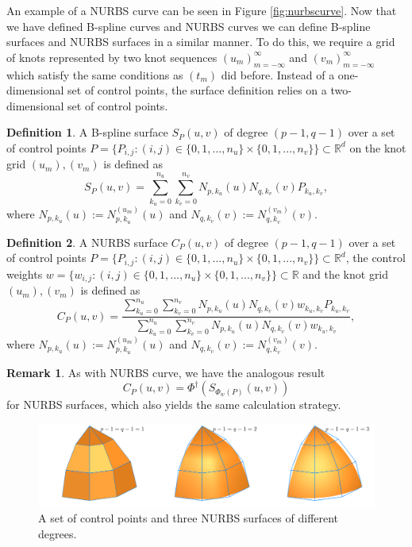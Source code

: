 \documentclass[a4paper, 11pt]{report}
\theoremstyle{definition}
\newtheorem{definition}{Definition}[section]
\newtheorem*{remark}{Remark}
\begin{document}
	An example of a NURBS curve can be seen in Figure \ref{fig:nurbscurve}. Now that we have defined B-spline curves and NURBS curves we can define B-spline surfaces and NURBS surfaces in a similar manner. To do this, we require a grid of knots represented by two knot sequences $(u_m)_{m=-\infty}^{\infty}$ and $(v_m)_{m=-\infty}^{\infty}$ which satisfy the same conditions as $(t_m)$ did before. Instead of a one-dimensional set of control points, the surface definition relies on a two-dimensional set of control points.

	\begin{definition}
		A B-spline surface $S_P(u,v)$ of degree $(p-1, q-1)$ over a set of control points $P = \{P_{i,j} : (i,j) \in \{0,1,...,n_u\} \times \{0,1,...,n_v\}\} \subset \mathbb{R}^d$ on the knot grid $(u_m), (v_m)$ is defined as
			$$ S_P(u,v) = \sum_{k_u=0}^{n_u} \sum_{k_v=0}^{n_v} N_{p,k_u}(u) N_{q,k_v}(v) P_{k_u,k_v},$$
		where $N_{p,k_u}(u) := N_{p,k_u}^{(u_m)}(u)$ and $N_{q,k_v}(v) := N_{q,k_v}^{(v_m)}(v)$.
	\end{definition}

	\begin{definition}
		A NURBS surface $C_P(u,v)$ of degree $(p-1, q-1)$ over a set of control points $P = \{P_{i,j} : (i,j) \in \{0,1,...,n_u\} \times \{0,1,...,n_v\}\} \subset \mathbb{R}^d$, the control weights $w = \{w_{i,j} : (i,j) \in \{0,1,...,n_u\} \times \{0,1,...,n_v\}\} \subset \mathbb{R}$ and the knot grid $(u_m), (v_m)$ is defined as
			$$ C_P(u,v) = \frac {\sum_{k_u=0}^{n_u} \sum_{k_v=0}^{n_v} N_{p,k_u}(u) N_{q,k_v}(v) w_{k_u, k_v} P_{k_u,k_v}}{\sum_{k_u=0}^{n_u} \sum_{k_v=0}^{n_v} N_{p,k_u}(u) N_{q,k_v}(v) w_{k_u, k_v}},$$
		where $N_{p,k_u}(u) := N_{p,k_u}^{(u_m)}(u)$ and $N_{q,k_v}(v) := N_{q,k_v}^{(v_m)}(v)$.
	\end{definition}

	\begin{remark}
		As with NURBS curve, we have the analogous result
			$$ C_P(u,v) = \Phi^\dagger ({S_{\Phi_w(P)}(u,v)}) $$
		for NURBS surfaces, which also yields the same calculation strategy.
	\end{remark}

	\begin{figure}[H]
		\centering
		\includegraphics[width=\textwidth]{../tec/nurbsSurface/nurbsSurface.png}
		\caption{A set of control points and three NURBS surfaces of different degrees.}
		\label{fig:nurbssurface}
	\end{figure}
\end{document}
